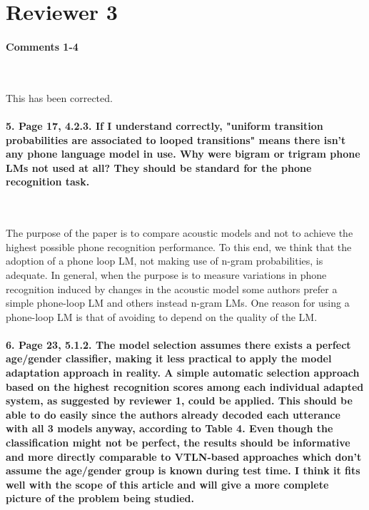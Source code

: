 \documentclass[]{article}
\begin{document}
\section{Reviewer 3}

\paragraph{Comments 1-4}

~

This has been corrected.

\paragraph{5. Page 17, 4.2.3. If I understand correctly, "uniform transition probabilities are associated to looped transitions" means there isn't any phone language model in use. Why were bigram or trigram phone LMs not used at all? They should be standard for the phone recognition task.}

~

The purpose of the paper is to compare acoustic models and not to achieve the highest possible phone recognition performance. To this end, we think that the adoption of a phone loop LM, not making use of n-gram probabilities, is adequate. In general, when the purpose is to measure variations in phone recognition induced by changes in the acoustic model some authors prefer a simple phone-loop LM and others instead n-gram LMs. One reason for using a phone-loop LM is that of avoiding to depend on the quality of the LM.

\paragraph{6. Page 23, 5.1.2. The model selection assumes there exists a perfect age/gender classifier, making it less practical to apply the model adaptation approach in reality. A simple automatic selection approach based on the highest recognition scores among each individual adapted system, as suggested by reviewer 1, could be applied. This should be able to do easily since the authors already decoded each utterance with all 3 models anyway, according to Table 4. Even though the classification might not be perfect, the results should be informative and more directly comparable to VTLN-based approaches which don't assume the age/gender group is known during test time. I think it fits well with the scope of this article and will give a more complete picture of the problem being studied.}
\end{document}
